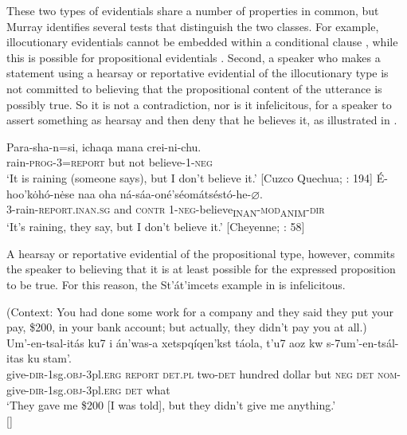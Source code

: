 These two types of evidentials share a number of properties in common, but Murray identifies several tests that distinguish the two classes. For example, illocutionary evidentials cannot be embedded within a conditional clause , while this is possible for propositional evidentials . Second, a speaker who makes a statement using a hearsay or reportative evidential of the illocutionary type is not committed to believing that the propositional content of the utterance is possibly true. So it is not a contradiction, nor is it infelicitous, for a speaker to assert something as hearsay and then deny that he believes it, as illustrated in .


\ea \label{ex:17.11}
\ea  \gll Para-sha-n=si,  ichaqa  mana  crei-ni-chu.\\
rain-\textsc{prog}-3=\textsc{report}  but  not  believe-1-\textsc{neg}\\
\glt ‘It is raining (someone says), but I don’t believe it.’ [Cuzco Quechua; \citealt{Faller2002}: 194]
\ex \gll  É-hoo'kȯhó-n\.ese  naa  oha  ná-sáa-oné'séomátséstó-he-⌀.\\
3-rain-\textsc{report}.\textsc{inan.sg}  and  \textsc{contr}  1-\textsc{neg}-believe\textsubscript{INAN}-\textsc{mod\textsubscript{A}}\textsubscript{NIM}-\textsc{dir}\\
\glt ‘It’s raining, they say, but I don’t believe it.’  [Cheyenne; \citealt{Murray2010}: 58]
\z \z


A hearsay or reportative evidential of the propositional type, however, commits the speaker to believing that it is at least possible for the expressed proposition to be true. For this reason, the St’át’imcets example in  is infelicitous.


\ea \label{ex:17.12}
(Context: You had done some work for a company and they said they put your pay, \$200, in your bank account; but actually, they didn’t pay you at all.)\\
\gll *Um’-en-tsal-itás  ku7  i  án’was-a  xetspqíqen’kst  táola, t’u7  aoz  kw  s-7um’-en-tsál-itas  ku  stam’.\\
 give-\textsc{dir}-1sg.\textsc{obj}-3pl.\textsc{erg}  \textsc{report}  \textsc{det.pl}  two-\textsc{det}  hundred  dollar but  \textsc{neg}  \textsc{det}  \textsc{nom}-give-\textsc{dir}-1sg.\textsc{obj}-3pl.\textsc{erg}  \textsc{det}  what\\
\glt ‘They gave me \$200 [I was told], but they didn’t give me anything.’\\
   {}[\citealt{MatthewsonEtAl2007}]
\z


